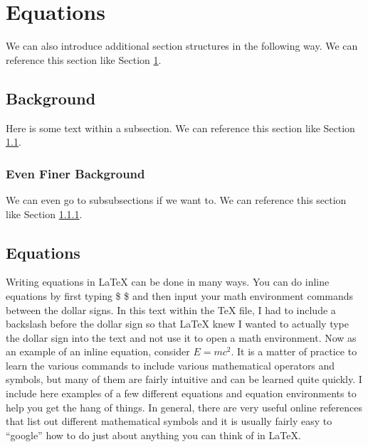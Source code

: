 \section{Equations}
\label{sec:equations}
We can also introduce additional section structures in the following way. We can reference this section like Section \ref{sec:equations}.

\subsection{Background}
\label{subsec:background}
Here is some text within a subsection. We can reference this section like Section \ref{subsec:background}.

\subsubsection{Even Finer Background}
\label{subsubsec:finer}
We can even go to subsubsections if we want to. We can reference this section like Section \ref{subsubsec:finer}.

\subsection{Equations}
\label{subsec:equations}
Writing equations in LaTeX can be done in many ways. You can do inline equations by first typing \$ \$ and then input your math environment commands between the dollar signs. In this text within the TeX file, I had to include a backslash before the dollar sign so that LaTeX knew I wanted to actually type the dollar sign into the text and not use it to open a math environment. Now as an example of an inline equation, consider $E = mc^2$. It is a matter of practice to learn the various commands to include various mathematical operators and symbols, but many of them are fairly intuitive and can be learned quite quickly. I include here examples of a few different equations and equation environments to help you get the hang of things. In general, there are very useful online references that list out different mathematical symbols and it is usually fairly easy to ``google'' how to do just about anything you can think of in LaTeX.

